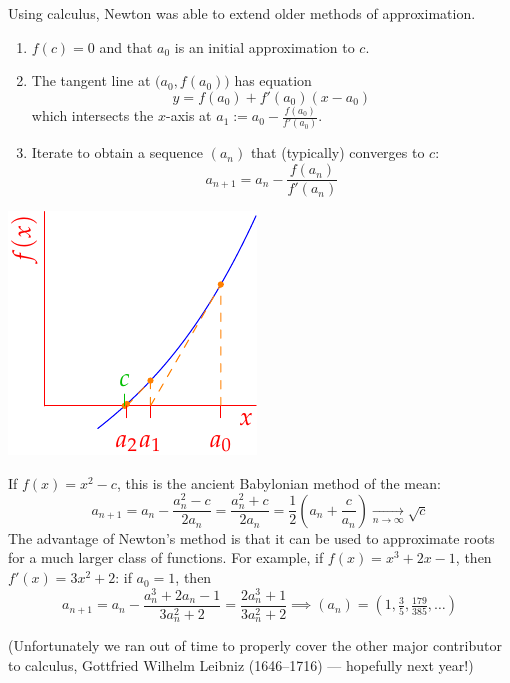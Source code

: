 
Using calculus, Newton was able to extend older methods of approximation.\par
\begin{minipage}[t]{0.7\linewidth}\vspace{-5pt}
\begin{enumerate}\itemsep0pt
  \item $f(c)=0$ and that $a_0$ is an initial approximation to $c$.
  \item The tangent line at $\bigl(a_0,f(a_0)\bigr)$ has equation
  \[y=f(a_0)+f'(a_0)(x-a_0)\]
  which intersects the $x$-axis at $a_1:=a_0-\frac{f(a_0)}{f'(a_0)}$.
  \item Iterate to obtain a sequence $(a_n)$ that (typically) converges to $c$:
  \[a_{n+1}=a_n-\frac{f(a_n)}{f'(a_n)}\]
\end{enumerate}
\end{minipage}
\hfill
\begin{minipage}[t]{0.29\linewidth}\vspace{-5pt}
\flushright\includegraphics{newtonsmethod}
\end{minipage}\medbreak

If $f(x)=x^2-c$, this is the ancient Babylonian method of the mean:
\[a_{n+1}=a_n-\frac{a_n^2-c}{2a_n}=\frac{a_n^2+c}{2a_n} =\frac 12\left(a_n+\frac c{a_n}\right)\xrightarrow[n\to\infty]{} \sqrt c\]
The advantage of Newton's method is that it can be used to approximate roots for a much larger class of functions. For example, if $f(x)=x^3+2x-1$, then $f'(x)=3x^2+2$: if $a_0=1$, then
\[a_{n+1}=a_n-\frac{a_n^3+2a_n-1}{3a_n^2+2} =\frac{2a_n^3+1}{3a_n^2+2} \implies (a_n)=(1,\tfrac 35,\tfrac{179}{385},\ldots)\]
\goodbreak


(Unfortunately we ran out of time to properly cover the other major contributor to calculus, Gottfried Wilhelm Leibniz (1646--1716) --- hopefully next year!)



